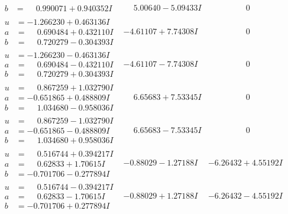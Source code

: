 \documentclass[1p]{elsarticle_modified}
\theoremstyle{definition}
\begin{document}
$$\begin{array}{c|c|c}
\begin{aligned}
b &= \phantom{-}0.990071 + 0.940352 I\end{aligned}
 & \phantom{-}5.00640 - 5.09433 I & \phantom{-0.000000 } 0 \\ \hline\begin{aligned}
u &= -1.266230 + 0.463136 I \\
a &= \phantom{-}0.690484 + 0.432110 I \\
b &= \phantom{-}0.720279 - 0.304393 I\end{aligned}
 & -4.61107 + 7.74308 I & \phantom{-0.000000 } 0 \\ \hline\begin{aligned}
u &= -1.266230 - 0.463136 I \\
a &= \phantom{-}0.690484 - 0.432110 I \\
b &= \phantom{-}0.720279 + 0.304393 I\end{aligned}
 & -4.61107 - 7.74308 I & \phantom{-0.000000 } 0 \\ \hline\begin{aligned}
u &= \phantom{-}0.867259 + 1.032790 I \\
a &= -0.651865 + 0.488809 I \\
b &= \phantom{-}1.034680 - 0.958036 I\end{aligned}
 & \phantom{-}6.65683 + 7.53345 I & \phantom{-0.000000 } 0 \\ \hline\begin{aligned}
u &= \phantom{-}0.867259 - 1.032790 I \\
a &= -0.651865 - 0.488809 I \\
b &= \phantom{-}1.034680 + 0.958036 I\end{aligned}
 & \phantom{-}6.65683 - 7.53345 I & \phantom{-0.000000 } 0 \\ \hline\begin{aligned}
u &= \phantom{-}0.516744 + 0.394217 I \\
a &= \phantom{-}0.62833 + 1.70615 I \\
b &= -0.701706 - 0.277894 I\end{aligned}
 & -0.88029 - 1.27188 I & -6.26432 + 4.55192 I \\ \hline\begin{aligned}
u &= \phantom{-}0.516744 - 0.394217 I \\
a &= \phantom{-}0.62833 - 1.70615 I \\
b &= -0.701706 + 0.277894 I\end{aligned}
 & -0.88029 + 1.27188 I & -6.26432 - 4.55192 I \\ \hline\begin{aligned}

\end{aligned}
\end{array}$$
\end{document}
